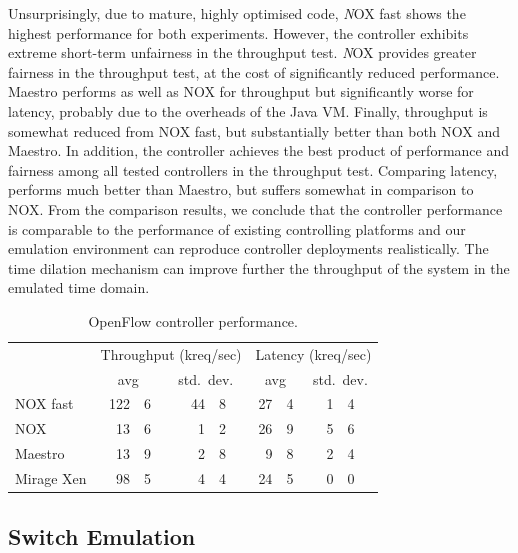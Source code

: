 Unsurprisingly, due to mature, highly optimised code, {\emph NOX fast} shows the
highest performance for both experiments. However, the controller exhibits
extreme short-term unfairness in the throughput test.  {\emph NOX} provides
greater fairness in the throughput test, at the cost of significantly reduced
performance. Maestro performs as well as NOX for throughput but significantly
worse for latency, probably due to the overheads of the Java VM\@.  Finally,
\mirage throughput is somewhat reduced from NOX fast, but substantially better
than both NOX and Maestro. In addition, the \mirage controller achieves the best
product of performance and fairness among all tested controllers in the
throughput test.  Comparing latency, \mirage performs much better than Maestro,
but suffers somewhat in comparison to NOX\@. From the comparison results, we
conclude that the \mirage controller performance is comparable to the
performance of existing controlling platforms and our emulation environment can
reproduce controller deployments realistically. The \sdnsim time dilation
mechanism can improve further the throughput of the system in the emulated time
domain.

\begin{table}
\newcommand\T{\rule{0pt}{2.6ex}}
\newcommand\B{\rule[-1.2ex]{0pt}{0pt}}
\centering
\begin{tabular} {l |r@{.}l r@{.}l|r@{.}l r@{.}l}
\hline
\T \multirow{2}{*}{Controller} 
   & \multicolumn{4}{c|}{Throughput (kreq/sec)}  
   & \multicolumn{4}{c}{Latency (kreq/sec)} \\
\B & \multicolumn{2}{c}{avg} & \multicolumn{2}{c|}{std.\ dev.} 
   & \multicolumn{2}{c}{avg} & \multicolumn{2}{c}{std.\ dev.} \\
\hline
\T NOX fast   & 122&6 & \quad{} 44&8 & 27&4 & \quad{} 1&4 \\
NOX           &  13&6 &  1&2 & 26&9 & 5&6 \\
Maestro       &  13&9 &  2&8 &  9&8 & 2&4 \\
\B Mirage Xen &  98&5 &  4&4 & 24&5 & 0&0 \\
\hline
\end{tabular}
\caption{\label{tbl:controller}OpenFlow controller performance.}
\end{table}

\subsection{\mirage Switch Emulation} \label{sec:of-switch-perf}

